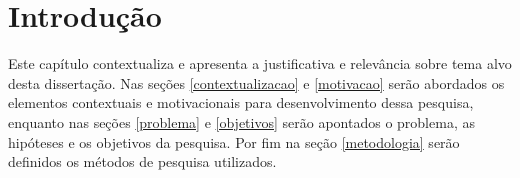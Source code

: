 \chapter{Introdução}
\label{chap:intro}

Este capítulo contextualiza e apresenta a justificativa e relevância sobre tema alvo desta dissertação. Nas seções \ref{contextualizacao} e \ref{motivacao} serão abordados os elementos contextuais e motivacionais para desenvolvimento dessa pesquisa, enquanto nas seções \ref{problema} e \ref{objetivos} serão apontados o problema, as hipóteses e os objetivos da pesquisa. Por fim na seção \ref{metodologia} serão definidos os métodos de pesquisa utilizados.


 

 
  
  
 
 
      
 
 
% 
 
% 

%

%

%  
